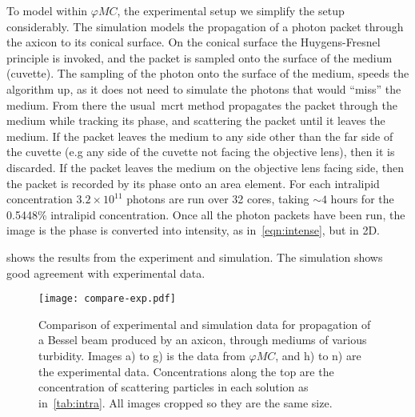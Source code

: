 To model within $\varphi MC$, the experimental setup we simplify the setup considerably.
The simulation models the propagation of a photon packet through the axicon to its conical surface. 
On the conical surface the Huygens-Fresnel principle is invoked, and the packet is sampled onto the surface of the medium (cuvette).
The sampling of the photon onto the surface of the medium, speeds the algorithm up, as it does not need to simulate the photons that would ``miss'' the medium.
From there the usual~\gls*{mcrt} method propagates the packet through the medium while tracking its phase, and scattering the packet until it leaves the medium.
If the packet leaves the medium to any side other than the far side of the cuvette (e.g any side of the cuvette not facing the objective lens), then it is discarded.
If the packet leaves the medium on the objective lens facing side, then the packet is recorded by its phase onto an area element.
For each intralipid concentration $3.2\times10^{11}$ photons are run over 32 cores, taking $\sim 4$ hours for the 0.5448\% intralipid concentration.
Once all the photon packets have been run, the image is the phase is converted into intensity, as in~\cref{eqn:intense}, but in 2D.

 shows the results from the experiment and simulation. The simulation shows good agreement with experimental data.

\begin{figure}[!ht]
\centering
\texttt{[image: compare-exp.pdf]}
\caption{Comparison of experimental and simulation data for propagation of a Bessel beam produced by an axicon, through mediums of various turbidity. Images a) to g) is the data from $\varphi MC$, and h) to n) are the experimental data. Concentrations along the top are the concentration of scattering particles in each solution as in~\cref{tab:intra}. All images cropped so they are the same size.}
\label{fig:compareexpbessel}
\end{figure}



\FloatBarrier

